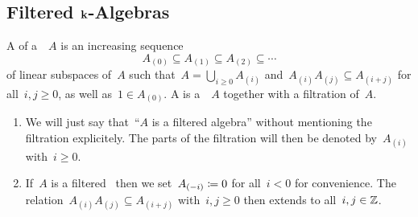 



\subsection{Filtered \texorpdfstring{$\kf$}{k}-Algebras}


\begin{definition}
  A  of a~\algebra{$\kf$}~$A$ is an increasing sequence
  \[
    A_{(0)}
    \subseteq
    A_{(1)}
    \subseteq
    A_{(2)}
    \subseteq
    \dotsb
  \]
  of linear subspaces of~$A$ such that~$A = \bigcup_{i \geq 0} A_{(i)}$ and~$A_{(i)} A_{(j)} \subseteq A_{(i+j)}$ for all~$i,j \geq 0$, as well as~$1 \in A_{(0)}$.
  A  is a~\algebra{$\kf$}~$A$ together with a filtration of~$A$.
\end{definition}


\begin{remark}
  \label{filtration conventions}
  \leavevmode
  \begin{enumerate}
    \item
      We will just say that~\enquote{$A$ is a filtered algebra} without mentioning the filtration explicitely.
      The parts of the filtration will then be denoted by~$A_{(i)}$ with~$i \geq 0$.
    \item
      If~$A$ is a filtered~{\algebra{$\kf$}} then we set~$A_{(-i)} \coloneqq 0$ for all~$i < 0$ for convenience.
      The relation~$A_{(i)} A_{(j)} \subseteq A_{(i+j)}$ with~$i,j \geq 0$ then extends to all~$i, j \in \mathbb{Z}$.
  \end{enumerate}
\end{remark}


